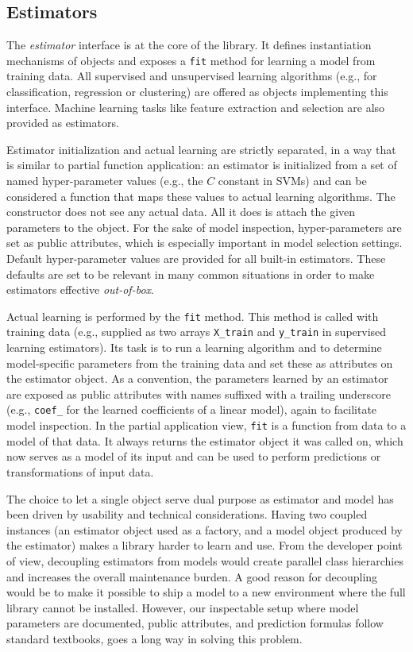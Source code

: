 \documentclass[twocolumn]{article}
\begin{document}
\subsection{Estimators}
\label{sec:estimators}

The \textit{estimator} interface is at the core of the
library. It defines instantiation mechanisms of objects and exposes a
\texttt{fit} method for learning a model from training data.  All supervised and
unsupervised learning algorithms (e.g., for classification, regression or
clustering) are offered as objects implementing this interface. Machine
learning tasks like feature extraction and selection are also provided as estimators.

Estimator initialization and actual learning are strictly separated,
in a way that is similar to partial function application:
an estimator is initialized from a set of named hyper-parameter values
(e.g., the $C$ constant in SVMs)
and can be considered a function
that maps these values to actual learning algorithms.
The constructor does not see any actual data.
All it does is attach the given parameters to the object.
For the sake of model inspection, hyper-parameters are set as public attributes,
which is especially important in model selection settings.
Default hyper-parameter values are provided for all built-in estimators.
These defaults are set to be relevant in many common
situations in order to make estimators effective \textit{out-of-box}.

Actual learning is performed by the \texttt{fit} method. This method is called
with training data (e.g., supplied as two arrays \texttt{X\_train} and
\texttt{y\_train} in supervised learning estimators). Its task is to run a
learning algorithm and to determine model-specific parameters from the training
data and set these as attributes on the estimator object. As a convention, the
parameters learned by an estimator are exposed as public attributes with names
suffixed with a trailing underscore (e.g., \texttt{coef\_} for the
learned coefficients of a linear model),
again to facilitate model inspection.
In the partial application view,
\texttt{fit} is a function from data to a model of that data.
It always returns the estimator object it was called on,
which now serves as a model of its input and can be used to perform predictions or transformations of input data.

The choice to let a single object serve dual purpose as
estimator and model has been driven by usability and technical considerations.
Having two coupled instances
(an estimator object used as a factory, and a model object produced by the estimator)
makes a library harder to learn and use.
From the developer point of view, decoupling
estimators from models would create parallel class hierarchies and increases the
overall maintenance burden.
A good reason for decoupling would be to make it possible to ship a model
to a new environment where the full library cannot be installed.
However, our inspectable setup where model parameters are documented,
public attributes, and prediction formulas follow standard textbooks,
goes a long way in solving this problem.
\end{document}
